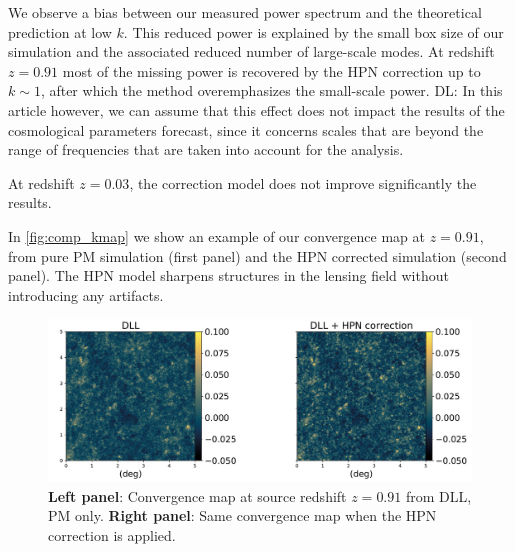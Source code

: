 \documentclass[twocolumn,twocolappendix]{aastex63}
\newcommand{\denise}[1]{{\color{red}DL: #1}}
\begin{document}
 We observe a bias between our measured power spectrum and the theoretical prediction at low $k$. This reduced power is explained by the small box size of our simulation and the associated reduced number of large-scale modes.  At redshift $z=0.91$ most of the missing
power is recovered by the HPN correction up to $k \sim 1$, after which the method overemphasizes the small-scale power. \denise{In this article however, we can assume that this effect does not impact the results of the cosmological parameters forecast, since it concerns scales that are beyond the range of frequencies that are taken into account for the analysis.}

At redshift $z=0.03$, the correction model does not improve significantly the results.


In \autoref{fig:comp_kmap} we show an example of our convergence map at $ z= 0.91$, from pure PM simulation (first panel) and the HPN corrected simulation (second panel). The HPN model sharpens structures in the lensing field without introducing any artifacts.
\begin{figure}
    \centering
    \includegraphics[width=\textwidth]{paper/figures/kmap_dll_vs_hpn.pdf}
    \caption{ \textbf{Left panel}: Convergence map at source redshift $z= 0.91$ from DLL, PM only.
    \textbf{Right panel}: Same convergence map when the HPN correction is applied. 
    }
    \label{fig:comp_kmap}
\end{figure}
\end{document}
